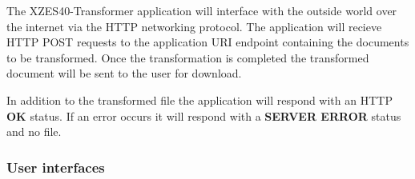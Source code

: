 The XZES40-Transformer application will interface with the outside world over the internet via the HTTP networking protocol.
The application will recieve HTTP POST requests to the application URI endpoint containing the documents to be transformed.
Once the transformation is completed the transformed document will be sent to the user for download.

In addition to the transformed file the application will respond with an HTTP \textbf{OK} status.
If an error occurs it will respond with a \textbf{SERVER ERROR} status and no file.

%

\subsubsection{User interfaces}

